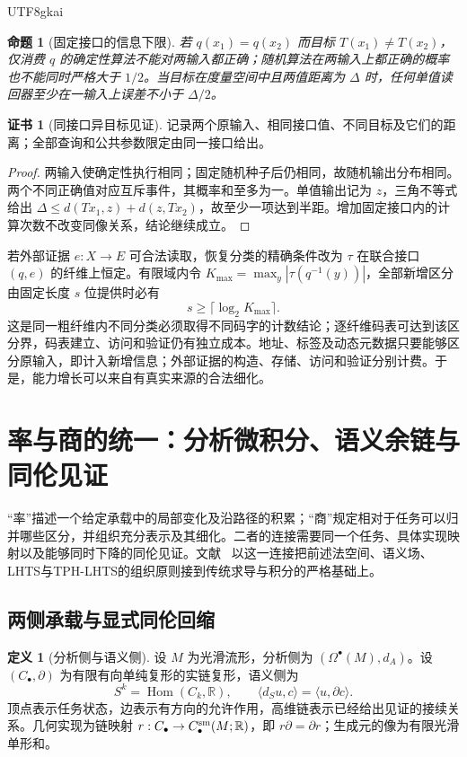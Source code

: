 \documentclass[11pt,a4paper]{article}
\theoremstyle{plain}
\newtheorem{proposition}[theorem]{命题}
\theoremstyle{definition}
\newtheorem{definition}[theorem]{定义}
\newtheorem*{certificate}{证书}
\theoremstyle{remark}
\begin{document}
\begin{CJK*}{UTF8}{gkai}
\begin{proposition}[固定接口的信息下限]
\label{pc:information-limit}
若 $q(x_1)=q(x_2)$ 而目标 $T(x_1)\ne T(x_2)$，仅消费 $q$ 的确定性算法不能对两输入都正确；随机算法在两输入上都正确的概率也不能同时严格大于 $1/2$。当目标在度量空间中且两值距离为 $\Delta$ 时，任何单值读回器至少在一输入上误差不小于 $\Delta/2$。
\end{proposition}
\begin{certificate}[同接口异目标见证]
记录两个原输入、相同接口值、不同目标及它们的距离；全部查询和公共参数限定由同一接口给出。
\end{certificate}
\begin{proof}
两输入使确定性执行相同；固定随机种子后仍相同，故随机输出分布相同。两个不同正确值对应互斥事件，其概率和至多为一。单值输出记为 $z$，三角不等式给出 $\Delta\le d(Tx_1,z)+d(z,Tx_2)$，故至少一项达到半距。增加固定接口内的计算次数不改变同像关系，结论继续成立。
\end{proof}

若外部证据 $e:X\to E$ 可合法读取，恢复分类的精确条件改为 $\tau$ 在联合接口 $(q,e)$ 的纤维上恒定。有限域内令 $K_{\max}=\max_y|\tau(q^{-1}(y))|$，全部新增区分由固定长度 $s$ 位提供时必有
\[
 s\ge\lceil\log_2K_{\max}\rceil.
\]
这是同一粗纤维内不同分类必须取得不同码字的计数结论；逐纤维码表可达到该区分界，码表建立、访问和验证仍有独立成本。地址、标签及动态元数据只要能够区分原输入，即计入新增信息；外部证据的构造、存储、访问和验证分别计费。于是，能力增长可以来自有真实来源的合法细化。

\section{率与商的统一：分析微积分、语义余链与同伦见证}
\label{pc:calculus}

“率”描述一个给定承载中的局部变化及沿路径的积累；“商”规定相对于任务可以归并哪些区分，并组织充分表示及其细化。二者的连接需要同一个任务、具体实现映射以及能够同时下降的同伦见证。文献~\cite{S38} 以这一连接把前述法空间、语义场、LHTS与TPH-LHTS的组织原则接到传统求导与积分的严格基础上。

\subsection{两侧承载与显式同伦回缩}

\begin{definition}[分析侧与语义侧]
设 $M$ 为光滑流形，分析侧为 $(\Omega^\bullet(M),d_A)$。设 $(C_\bullet,\partial)$ 为有限有向单纯复形的实链复形，语义侧为
\[
 S^k=\operatorname{Hom}(C_k,\mathbb R),\qquad
 \langle d_Su,c\rangle=\langle u,\partial c\rangle.
\]
顶点表示任务状态，边表示有方向的允许作用，高维链表示已经给出见证的接续关系。几何实现为链映射 $r:C_\bullet\to C_\bullet^{\rm sm}(M;\mathbb R)$，即 $r\partial=\partial r$；生成元的像为有限光滑单形和。
\end{definition}


\end{CJK*}
\end{document}
